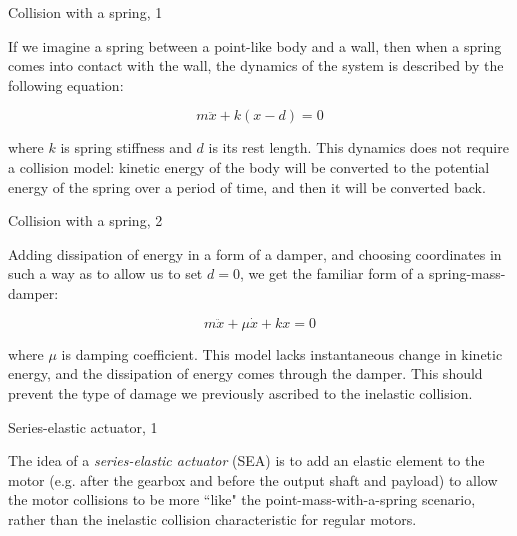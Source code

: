 \documentclass{beamer}
\begin{document}
\begin{frame}{Collision with a spring, 1}
	\begin{flushleft}
		
		If we imagine a spring between a point-like body and a wall, then when a spring comes into contact with the wall, the dynamics of the system is described by the following equation:
		
		\begin{equation}
			m \ddot x + k (x - d) = 0
		\end{equation}
	
		where $k$ is spring stiffness and $d$ is its rest length. This dynamics does not require a collision model: kinetic energy of the body will be converted to the potential energy of the spring over a period of time, and then it will be converted back.
		
	\end{flushleft}
\end{frame}



\begin{frame}{Collision with a spring, 2}
	\begin{flushleft}
		
		Adding dissipation of energy in a form of a damper, and choosing coordinates in such a way as to allow us to set $d = 0$, we get the familiar form of a spring-mass-damper:
		
		\begin{equation}
			m \ddot x + \mu \dot x + k x = 0
		\end{equation}
		
		where $\mu$ is damping coefficient. This model lacks instantaneous change in kinetic energy, and the dissipation of energy comes through the damper. This should prevent the type of damage we previously ascribed to the inelastic collision.
		
	\end{flushleft}
\end{frame}



\begin{frame}{Series-elastic actuator, 1}
	\begin{flushleft}
		
		The idea of a \emph{series-elastic actuator} (SEA) is to add an elastic element to the motor (e.g. after the gearbox and before the output shaft and payload) to allow the motor collisions to be more ``like" the point-mass-with-a-spring scenario, rather than the inelastic collision characteristic for regular motors.  
		
	\end{flushleft}
\end{frame}
\end{document}
